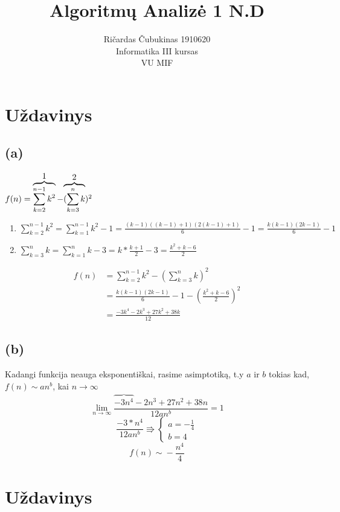 \documentclass[a4paper,lithuanian]{article}
\title{Algoritmų Analizė 1 N.D}
\author{
  Ričardas Čubukinas 1910620\\
  Informatika III kursas\\
  VU MIF
}
\begin{document}
\maketitle

\section{Uždavinys}
\subsection*{(a)}
$f(n)=\overbrace{\sum_{k=2}^{n-1}k^2}^{\hbox{1}}-{\overbrace{(\sum_{k=3}^{n}k}^{\hbox{2}})^2}$
\begin{enumerate}
  \item{$\sum_{k=2}^{n-1}k^2 = \sum_{k=1}^{n-1}k^2 - 1 = \frac{(k-1)((k-1)+1)(2(k-1)+1)}{6}-1=\frac{k(k-1)(2k-1)}{6}-1$}
  \item{$\sum_{k=3}^{n}k =  \sum_{k=1}^{n}k - 3 = k*\frac{k+1}{2} - 3 = \frac{k^2+k-6}{2}$}
\end{enumerate}
\begin{equation}
  \begin{aligned}
    f(n) & = \sum_{k=2}^{n-1}k^2-(\sum_{k=3}^{n}k)^2\\
         & = \frac{k(k-1)(2k-1)}{6}-1-{(\frac{k^2+k-6}{2})}^2\\
         & = \frac{-3k^4-2k^3+27k^2+38k}{12}
  \end{aligned}
\end{equation}
\subsection*{(b)}
Kadangi funkcija neauga eksponentiškai, rasime asimptotiką, t.y $a$ ir $b$ tokias kad, $f(n)\sim{}an^b$, kai $n\rightarrow{}\infty{}$
\begin{equation}
\lim_{n\rightarrow{}\infty{}}\frac{\overbrace{-3n^4}^{}-2n^3+27n^2+38n}{12an^b} = 1
\end{equation}
\begin{equation}
  \frac{-3*n^4}{12an^b} \Rrightarrow{} \begin{cases} a = -\frac{1}{4} \\ b = 4  \end{cases}
\end{equation}
\begin{equation}
f(n)\sim{}-\frac{n^4}{4}
\end{equation}
\section{Uždavinys}
\end{document}
